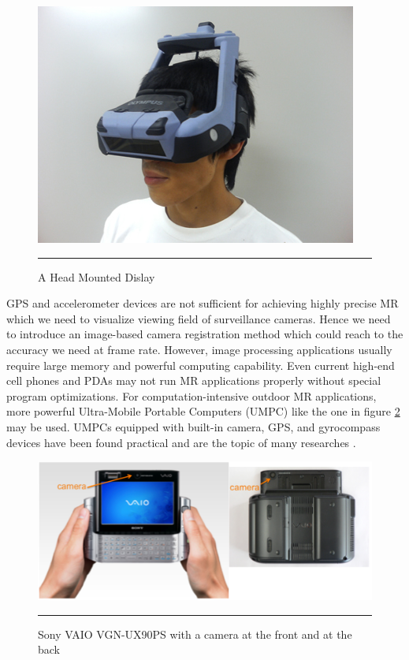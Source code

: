 \begin{figure}[htbp]
	\centering
	\includegraphics{./Primitives/hmd.jpg}
	\rule{35em}{0.5pt}
	\caption[A Head Mounted Dislay]{A Head Mounted Dislay}
	\label{fig:HMD}
\end{figure}

GPS and accelerometer devices are not sufficient for achieving highly precise MR which we need to visualize viewing field of surveillance cameras. Hence we need to introduce an image-based camera registration method which could reach to the accuracy we need at frame rate. However, image processing applications usually require large memory and powerful computing capability. Even current high-end cell phones and PDAs may not run MR applications properly without special program optimizations. For computation-intensive outdoor MR applications, more powerful Ultra-Mobile Portable Computers (UMPC) like the one in figure \ref{fig:VAIO} may be used. UMPCs equipped with built-in camera, GPS, and gyrocompass devices have been found practical and are the topic of many researches \cite{Reference2} \cite{Reference4} \cite{Reference13}.

\begin{figure}[htbp]
	\centering
	\includegraphics[width=14cm]{./Primitives/vaio.png}
	\rule{35em}{0.5pt}
	\caption[Sony VAIO VGN-UX90PS]{Sony VAIO VGN-UX90PS with a camera at the front and at the back}
	\label{fig:VAIO}
\end{figure}

